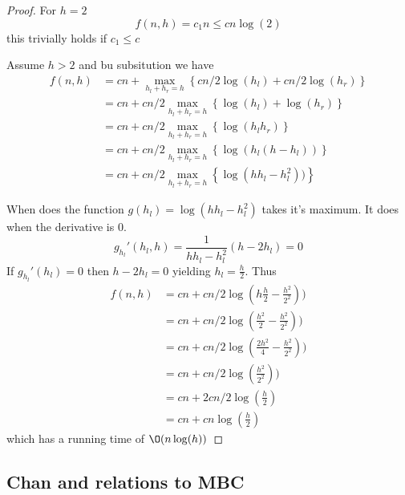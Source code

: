 \documentclass[10pt]{article}
\begin{document}
\begin{proof}

  For $h=2$                
  \begin{equation}
    f(n,h) = c_1n \leq cn\log(2)
  \end{equation}
  this trivially holds if $c_1 \leq c$
  
  Assume $h>2$ and bu subsitution we have
  \begin{align*}
   f(n,h) &= cn + \max_{h_l+h_r = h}\left\{cn/2\log(h_l)+cn/2\log(h_r)\right\} \\
          &= cn + cn/2\max_{h_l+h_r = h}\left\{\log(h_l)+\log(h_r)\right\} \\
          &= cn + cn/2\max_{h_l+h_r = h}\left\{\log(h_lh_r)\right\} \\          
          &= cn + cn/2\max_{h_l+h_r = h}\left\{\log(h_l(h-h_l))\right\} \\         
          &= cn + cn/2\max_{h_l+h_r = h}\left\{\log(hh_l-h_l^2))\right\}                    
  \end{align*}
    
  When does the function $g(h_l) = \log(hh_l-h_l^2)$ takes it's maximum. It does when the derivative is $0$.
  \begin{equation}
    g_{h_l}'(h_l,h) = \frac{1}{hh_l-h_l^2} (h-2h_l) = 0 
  \end{equation}
  If $g_{h_l}'(h_l)=0$ then $h-2h_l=0$ yielding $h_l = \frac{h}{2}$. Thus
  \begin{align*}
   f(n,h) &= cn + cn/2\log(h\frac{h}{2}-\frac{h^2}{2^2})) \\
          &= cn + cn/2\log(\frac{h^2}{2}-\frac{h^2}{2^2})) \\   
          &= cn + cn/2\log(\frac{2h^2}{4}-\frac{h^2}{2^2})) \\
          &= cn + cn/2\log(\frac{h^2}{2^2})) \\                       
          &= cn + 2cn/2\log(\frac{h}{2}) \\                                 
          &= cn + cn\log(\frac{h}{2})                                 
  \end{align*}
   which has a running time of $\O(n\log(h))$
   
\end{proof}



\subsection{Chan and relations to MBC} %
\label{sub:chan_and_relations_to_mbc}
\end{document}
